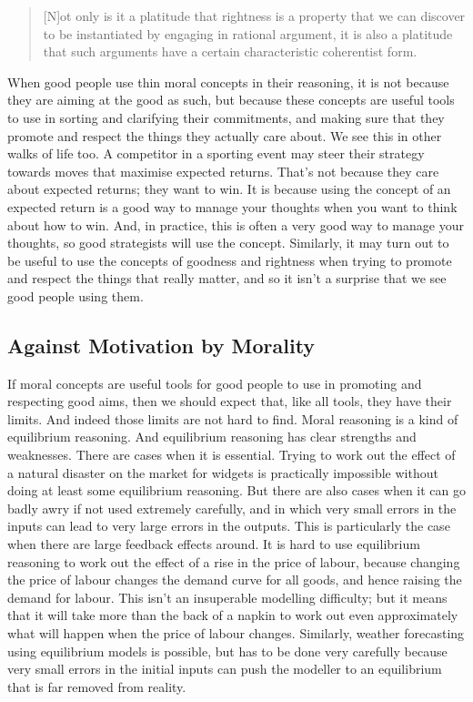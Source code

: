 \begin{quote}
[N]ot only is it a platitude that rightness is a property that we can discover to be instantiated by engaging in rational argument, it is also a platitude that such arguments have a certain characteristic coherentist form. ~\citep[40]{Smith1994}
\end{quote}
When good people use thin moral concepts in their reasoning, it is not because they are aiming at the good as such, but because these concepts are useful tools to use in sorting and clarifying their commitments, and making sure that they promote and respect the things they actually care about. We see this in other walks of life too. A competitor in a sporting event may steer their strategy towards moves that maximise expected returns. That's not because they care about expected returns; they want to win. It is because using the concept of an expected return is a good way to manage your thoughts when you want to think about how to win. And, in practice, this is often a very good way to manage your thoughts, so good strategists will use the concept. Similarly, it may turn out to be useful to use the concepts of goodness and rightness when trying to promote and respect the things that really matter, and so it isn't a surprise that we see good people using them.

\subsection{Against Motivation by Morality}
\label{againstmotivationbymorality}

If moral concepts are useful tools for good people to use in promoting and respecting good aims, then we should expect that, like all tools, they have their limits. And indeed those limits are not hard to find. Moral reasoning is a kind of equilibrium reasoning. And equilibrium reasoning has clear strengths and weaknesses. There are cases when it is essential. Trying to work out the effect of a natural disaster on the market for widgets is practically impossible without doing at least some equilibrium reasoning. But there are also cases when it can go badly awry if not used extremely carefully, and in which very small errors in the inputs can lead to very large errors in the outputs. This is particularly the case when there are large feedback effects around. It is hard to use equilibrium reasoning to work out the effect of a rise in the price of labour, because changing the price of labour changes the demand curve for all goods, and hence raising the demand for labour. This isn't an insuperable modelling difficulty; but it means that it will take more than the back of a napkin to work out even approximately what will happen when the price of labour changes. Similarly, weather forecasting using equilibrium models is possible, but has to be done very carefully because very small errors in the initial inputs can push the modeller to an equilibrium that is far removed from reality.


